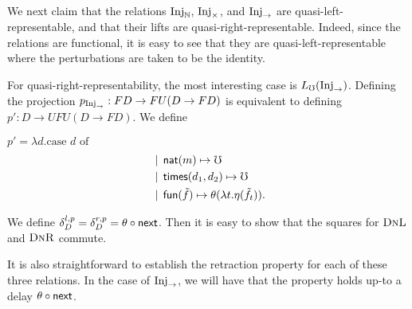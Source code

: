 We next claim that the relations $\text{Inj}_\mathbb{N}$, $\text{Inj}_\times$, and $\text{Inj}_\to$ are quasi-left-representable,
and that their lifts are quasi-right-representable.
Indeed, since the relations are functional, it is easy to see that they are quasi-left-representable
where the perturbations are taken to be the identity.

For quasi-right-representability, the most interesting case is $L_\mho(\text{Inj}_\to)$.
Defining the projection $p_{\text{Inj}_\to} : FD \to FU(D \to FD)$ is equivalent to defining
$p' : D \to UFU(D \to FD)$. We define

$p' = \lambda d.\text{case $d$ of}$
\begin{align*}
    &\mathrel{\bf \,\mid\,} \mathsf{nat}(m) \mapsto \mho \\
    &\mathrel{\bf \,\mid\,} \mathsf{times}(d_1, d_2) \mapsto \mho \\
    &\mathrel{\bf \,\mid\,} \mathsf{fun}(\tilde{f}) \mapsto \theta (\lambda t. \eta(\tilde{f}_t)).
\end{align*}

We define $\delta^{l,p}_D = \delta^{r,p}_D = \theta \circ \mathsf{next}$.
Then it is easy to show that the squares for $\textsc{DnL}$ and $\textsc{DnR}$ commute.

It is also straightforward to establish the retraction property for
each of these three relations. In the case of $\text{Inj}_\to$, we will
have that the property holds up-to a delay $\theta \circ \mathsf{next}$.


